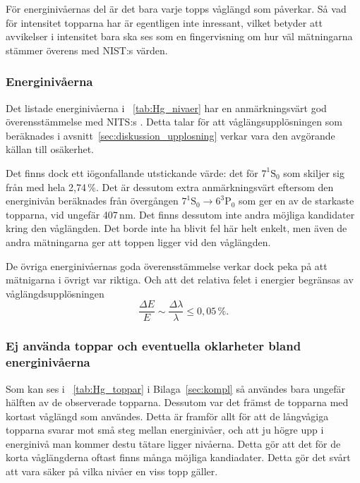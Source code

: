 \documentclass[11pt,a4paper]{article}
\newcommand{\tabref}{\tablename~\ref} %
\begin{document}
För energinivåernas del är det bara varje topps våglängd som
påverkar. Så vad för intensitet topparna har är egentligen inte
inressant, vilket betyder att avvikelser i intensitet bara ska ses som
en fingervisning om hur väl mätningarna stämmer överens med
NIST:s \cite{NIST_spectrum} värden.

\subsubsection{Energinivåerna}\label{sec:diskussion_energi}
Det listade energinivåerna i \tabref{tab:Hg_nivaer} har en
anmärkningsvärt god överensstämmelse med NITS:s
\cite{NIST_levels}. Detta talar för att våglängsupplösningen som
beräknades i avsnitt~\ref{sec:diskussion_upplosning} verkar vara den
avgörande källan till osäkerhet. 

Det finns dock ett iögonfallande utstickande värde: det för
$7^1\mathrm{S}_0$ som skiljer sig från \cite{NIST_levels} med hela
2,74\,\%. Det är dessutom extra anmärkningsvärt eftersom den
energinivån beräknades från övergången 
$7^1\mathrm{S}_0 \to 6^3\mathrm{P}_0$ som ger en av de starkaste
topparna, vid ungefär 407\,nm. Det finns dessutom inte andra möjliga
kandidater kring den våglängden. Det borde inte ha blivit fel här helt
enkelt, men även de andra mätningarna ger att toppen ligger vid den
våglängden. 

De övriga energinivåernas goda överensstämmelse verkar dock peka på
att mätnigarna i övrigt var riktiga. Och att det relativa felet i
energier begränsas av våglängdsupplösningen\footnotemark{}
\[
\frac{\Delta E}{E} \sim \frac{\Delta\lambda}{\lambda} \le 0,05\,\%.
\]

\subsubsection{Ej använda toppar 
               och eventuella oklarheter bland energinivåerna}

Som kan ses i \tabref{tab:Hg_toppar} i Bilaga~\ref{sec:kompl} så
användes bara ungefär hälften av de observerade topparna. Dessutom var
det främst de topparna med kortast våglängd som användes. Detta är
framför allt för att de långvågiga topparna svarar mot små steg
mellan energinivåer, och att ju högre upp i energinivå man kommer
destu tätare ligger nivåerna. Detta gör att det för de korta
våglängderna oftast finns många möjliga kandiadater. Detta gör det
svårt att vara säker på vilka nivåer en viss topp gäller. 
\end{document}
